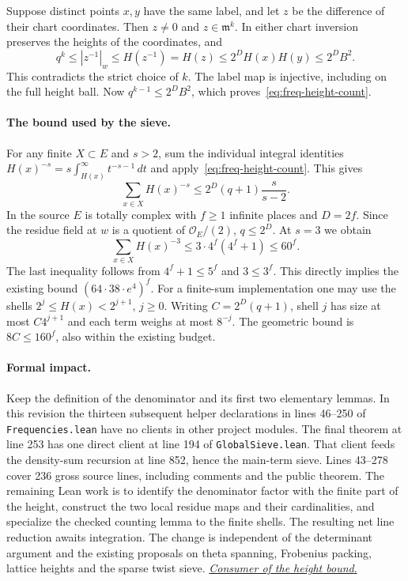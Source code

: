 \documentclass[11pt,letterpaper]{article}
\begin{document}
Suppose distinct points $x,y$ have the same label, and let $z$ be the difference of their chart coordinates. Then $z\ne0$ and $z\in\mathfrak m^k$. In either chart inversion preserves the heights of the coordinates, and
\[
 q^k\le |z^{-1}|_w\le H(z^{-1})=H(z)
     \le 2^D H(x)H(y)\le 2^D B^2.
\]
This contradicts the strict choice of $k$. The label map is injective, including on the full height ball. Now $q^{k-1}\le 2^D B^2$, which proves~\eqref{eq:freq-height-count}.

\paragraph{The bound used by the sieve.}
For any finite $X\subset E$ and $s>2$, sum the individual integral identities $H(x)^{-s}=s\int_{H(x)}^\infty t^{-s-1}\,dt$ and apply~\eqref{eq:freq-height-count}. This gives
\[
 \sum_{x\in X}H(x)^{-s}\le 2^D(q+1)\frac{s}{s-2}.
\]
In the source $E$ is totally complex with $f\ge1$ infinite places and $D=2f$. Since the residue field at $w$ is a quotient of $\mathcal O_E/(2)$, $q\le2^D$. At $s=3$ we obtain
\[
 \sum_{x\in X}H(x)^{-3}\le 3\cdot4^f(4^f+1)\le 60^f.
\]
The last inequality follows from $4^f+1\le5^f$ and $3\le3^f$. This directly implies the existing bound $(64\cdot38\cdot e^4)^f$. For a finite-sum implementation one may use the shells $2^j\le H(x)<2^{j+1}$, $j\ge0$. Writing $C=2^D(q+1)$, shell $j$ has size at most $C4^{j+1}$ and each term weighs at most $8^{-j}$. The geometric bound is $8C\le160^f$, also within the existing budget.

\paragraph{Formal impact.}
Keep the definition of the denominator and its first two elementary lemmas. In this revision the thirteen subsequent helper declarations in lines 46--250 of \texttt{Frequencies.lean} have no clients in other project modules. The final theorem at line 253 has one direct client at line 194 of \texttt{GlobalSieve.lean}. That client feeds the density-sum recursion at line 852, hence the main-term sieve. Lines 43--278 cover 236 gross source lines, including comments and the public theorem. The remaining Lean work is to identify the denominator factor with the finite part of the height, construct the two local residue maps and their cardinalities, and specialize the checked counting lemma to the finite shells. The resulting net line reduction awaits integration. The change is independent of the determinant argument and the existing proposals on theta spanning, Frobenius packing, lattice heights and the sparse twist sieve.
\href{https://github.com/VladimirReshetnikov/ProveIt/blob/8f274fb25a0be551cbb53ee802033689da108138/Analysis/GeneralizedRiemannHypothesis/Lean/grh/src/New/Spanning/MainTerm/GlobalSieve.lean#L177-L198}{\textit{Consumer of the height bound}.}
\end{document}
